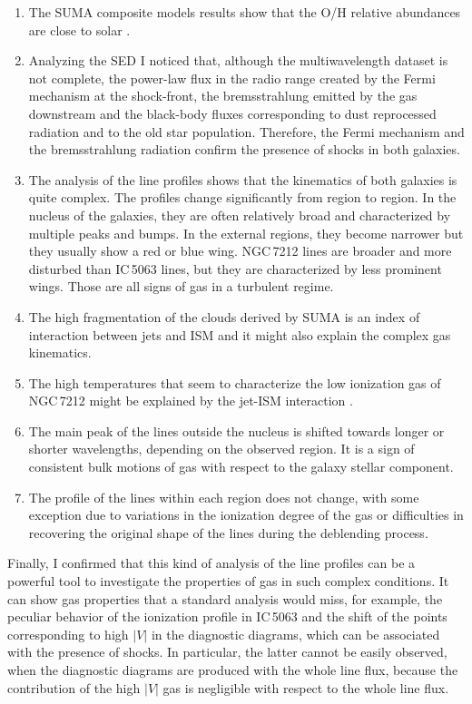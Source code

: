 \documentclass[../main.tex]{subfiles}
\begin{document}
\begin{enumerate}
\item The SUMA composite models results show that the O/H relative abundances are close to solar \citep{Allen76}.

\item Analyzing the SED I noticed that, although the multiwavelength dataset is not complete, the power-law flux in the radio range created by the Fermi mechanism at the shock-front, the bremsstrahlung emitted by the gas downstream and the black-body fluxes corresponding to dust reprocessed radiation and to the old star population.
Therefore, the Fermi mechanism and the bremsstrahlung radiation confirm the presence of shocks in both galaxies.

\item The analysis of the line profiles shows that the kinematics of both galaxies is quite complex.
The profiles change significantly from region to region. 
In the nucleus of the galaxies, they are often relatively broad and characterized by multiple peaks and bumps. 
In the external regions, they become narrower but they usually show a red or blue wing.
NGC\,7212 lines are broader and more disturbed than IC\,5063 lines, but they are characterized by less prominent wings.
Those are all signs of gas in a turbulent regime.

\item The high fragmentation of the clouds derived by SUMA is an index of interaction between jets and ISM and it might also explain the complex gas kinematics.

\item The high temperatures that seem to characterize the low ionization gas of NGC\,7212 might be explained by the jet-ISM interaction \citep{Roche16}.

\item The main peak of the lines outside the nucleus is shifted towards longer or shorter wavelengths, depending on the observed region.
It is a sign of consistent bulk motions of gas with respect to the galaxy stellar component.

\item The profile of the lines within each region does not change, with some exception due to variations in the ionization degree of the gas or difficulties in recovering the original shape of the lines during the deblending process.
\end{enumerate}

Finally, I confirmed that this kind of analysis of the line profiles can be a powerful tool to investigate the properties of gas in such complex conditions.
It can show gas properties that a standard analysis would miss, for example, the peculiar behavior of the ionization profile in IC\,5063 and the shift of the points corresponding to high $\lvert V\rvert$ in the diagnostic diagrams, which can be associated with the presence of shocks.
In particular, the latter cannot be easily observed, when the diagnostic diagrams are produced with the whole line flux, because the contribution of the high $\lvert V\rvert$ gas is negligible with respect to the whole line flux.
\end{document}
